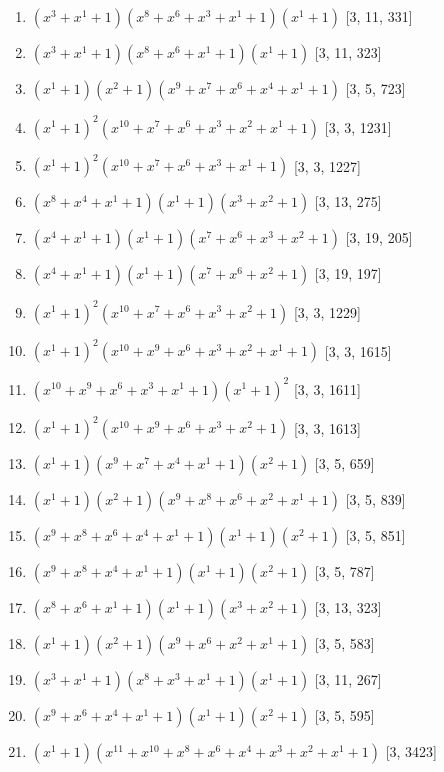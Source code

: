 \documentclass[10pt,twocolumn]{article}
\begin{document}
\begin{enumerate}
\item $(x^{3} + x^{1} + 1)(x^{8} + x^{6} + x^{3} + x^{1} + 1)(x^{1} + 1)$  [3, 11, 331]
\item $(x^{3} + x^{1} + 1)(x^{8} + x^{6} + x^{1} + 1)(x^{1} + 1)$  [3, 11, 323]
\item $(x^{1} + 1)(x^{2} + 1)(x^{9} + x^{7} + x^{6} + x^{4} + x^{1} + 1)$  [3, 5, 723]
\item $(x^{1} + 1)^{2}(x^{10} + x^{7} + x^{6} + x^{3} + x^{2} + x^{1} + 1)$  [3, 3, 1231]
\item $(x^{1} + 1)^{2}(x^{10} + x^{7} + x^{6} + x^{3} + x^{1} + 1)$  [3, 3, 1227]
\item $(x^{8} + x^{4} + x^{1} + 1)(x^{1} + 1)(x^{3} + x^{2} + 1)$  [3, 13, 275]
\item $(x^{4} + x^{1} + 1)(x^{1} + 1)(x^{7} + x^{6} + x^{3} + x^{2} + 1)$  [3, 19, 205]
\item $(x^{4} + x^{1} + 1)(x^{1} + 1)(x^{7} + x^{6} + x^{2} + 1)$  [3, 19, 197]
\item $(x^{1} + 1)^{2}(x^{10} + x^{7} + x^{6} + x^{3} + x^{2} + 1)$  [3, 3, 1229]
\item $(x^{1} + 1)^{2}(x^{10} + x^{9} + x^{6} + x^{3} + x^{2} + x^{1} + 1)$  [3, 3, 1615]
\item $(x^{10} + x^{9} + x^{6} + x^{3} + x^{1} + 1)(x^{1} + 1)^{2}$  [3, 3, 1611]
\item $(x^{1} + 1)^{2}(x^{10} + x^{9} + x^{6} + x^{3} + x^{2} + 1)$  [3, 3, 1613]
\item $(x^{1} + 1)(x^{9} + x^{7} + x^{4} + x^{1} + 1)(x^{2} + 1)$  [3, 5, 659]
\item $(x^{1} + 1)(x^{2} + 1)(x^{9} + x^{8} + x^{6} + x^{2} + x^{1} + 1)$  [3, 5, 839]
\item $(x^{9} + x^{8} + x^{6} + x^{4} + x^{1} + 1)(x^{1} + 1)(x^{2} + 1)$  [3, 5, 851]
\item $(x^{9} + x^{8} + x^{4} + x^{1} + 1)(x^{1} + 1)(x^{2} + 1)$  [3, 5, 787]
\item $(x^{8} + x^{6} + x^{1} + 1)(x^{1} + 1)(x^{3} + x^{2} + 1)$  [3, 13, 323]
\item $(x^{1} + 1)(x^{2} + 1)(x^{9} + x^{6} + x^{2} + x^{1} + 1)$  [3, 5, 583]
\item $(x^{3} + x^{1} + 1)(x^{8} + x^{3} + x^{1} + 1)(x^{1} + 1)$  [3, 11, 267]
\item $(x^{9} + x^{6} + x^{4} + x^{1} + 1)(x^{1} + 1)(x^{2} + 1)$  [3, 5, 595]
\item $(x^{1} + 1)(x^{11} + x^{10} + x^{8} + x^{6} + x^{4} + x^{3} + x^{2} + x^{1} + 1)$  [3, 3423]

\end{enumerate}
\end{document}
